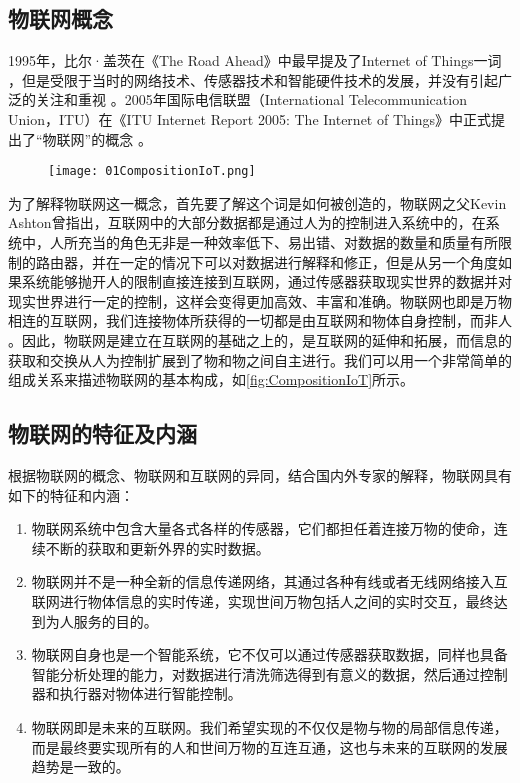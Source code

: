 	\subsection{物联网概念}
1995年，比尔·盖茨在《The Road Ahead》中最早提及了Internet of Things一词\supercite{BillGate1995} ，但是受限于当时的网络技术、传感器技术和智能硬件技术的发展，并没有引起广泛的关注和重视\supercite{HeYong2016} 。2005年国际电信联盟（International Telecommunication Union，ITU）在《ITU Internet Report 2005: The Internet of Things》中正式提出了“物联网”的概念\supercite{HeYong2016,ITU2005} 。
	\begin{figure}[!htbp]
  		\centering
 		\texttt{[image: 01CompositionIoT.png]}
	\end{figure}
为了解释物联网这一概念，首先要了解这个词是如何被创造的，物联网之父Kevin Ashton曾指出，互联网中的大部分数据都是通过人为的控制进入系统中的，在系统中，人所充当的角色无非是一种效率低下、易出错、对数据的数量和质量有所限制的路由器，并在一定的情况下可以对数据进行解释和修正，但是从另一个角度如果系统能够抛开人的限制直接连接到互联网，通过传感器获取现实世界的数据并对现实世界进行一定的控制，这样会变得更加高效、丰富和准确。物联网也即是万物相连的互联网，我们连接物体所获得的一切都是由互联网和物体自身控制，而非人\supercite{Peter2015} 。因此，物联网是建立在互联网的基础之上的，是互联网的延伸和拓展，而信息的获取和交换从人为控制扩展到了物和物之间自主进行。我们可以用一个非常简单的组成关系来描述物联网的基本构成，如\ref{fig:CompositionIoT}所示。
	
	\subsection{物联网的特征及内涵}
根据物联网的概念、物联网和互联网的异同，结合国内外专家的解释，物联网具有如下的特征和内涵：
	\begin{enumerate}
  		\item 物联网系统中包含大量各式各样的传感器，它们都担任着连接万物的使命，连续不断的获取和更新外界的实时数据。
  		\item 物联网并不是一种全新的信息传递网络，其通过各种有线或者无线网络接入互联网进行物体信息的实时传递，实现世间万物包括人之间的实时交互，最终达到为人服务的目的。
  		\item 物联网自身也是一个智能系统，它不仅可以通过传感器获取数据，同样也具备智能分析处理的能力，对数据进行清洗筛选得到有意义的数据，然后通过控制器和执行器对物体进行智能控制。
  		\item 物联网即是未来的互联网。我们希望实现的不仅仅是物与物的局部信息传递，而是最终要实现所有的人和世间万物的互连互通，这也与未来的互联网的发展趋势是一致的。
	\end{enumerate}
	
